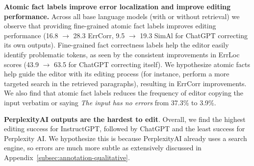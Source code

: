 \vspace{.3em}

\noindent \textbf{Atomic fact labels improve error localization and improve editing performance.} Across all base language models (with or without retrieval) we observe that providing fine-grained atomic fact labels improves editing performance (16.8 $\rightarrow$ 28.3 ErrCorr, 9.5 $\rightarrow$ 19.3 SimAl for ChatGPT correcting its own outputs). Fine-grained fact correctness labels help the editor easily identify problematic tokens, as seen by the consistent improvements in ErrLoc scores (43.9 $\rightarrow$ 63.5 for ChatGPT correcting itself). We hypothesize atomic facts help guide the editor with its editing process (for instance, perform a more targeted search in the retrieved paragraphs), resulting in ErrCorr improvements. We also find that atomic fact labels reduces the frequency of editor copying the input verbatim or saying \emph{The input has no errors} from 37.3\% to 3.9\%.

\vspace{.3em}

\noindent \textbf{PerplexityAI outputs are the hardest to edit}. Overall, we find the highest editing success for InstructGPT, followed by ChatGPT and the least success for Perplexity AI. We hypothesize this is because PerplexityAI already uses a search engine, so errors are much more subtle as extensively discussed in Appendix~\ref{subsec:annotation-qualitative}.



